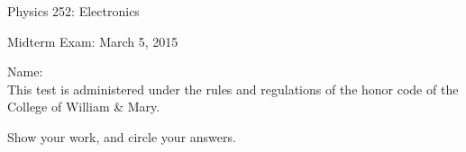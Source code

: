 \documentclass[letterpaper,addpoints]{exam}
\begin{document}
\begin{coverpages}
 \large\bfseries
 
 \noindent 
 Physics 252: Electronics
 
 \vspace{2ex}
 \noindent
 Midterm Exam: March 5, 2015

 \vspace{5ex}
 \noindent 
 Name:\enspace\makebox[2in]{\hrulefill}\\

 \vspace{5ex}
 \noindent 
 This test is administered under the rules and regulations of the honor 
 code of the College of William \& Mary.  

 \vspace{5ex}
 \noindent 
 Show your work, and circle your answers.
 
 \pagebreak
 \vspace{5ex}
 \begin{center}
  \combinedgradetable[v][questions]
 \end{center}
\end{coverpages}
 
\end{document}
